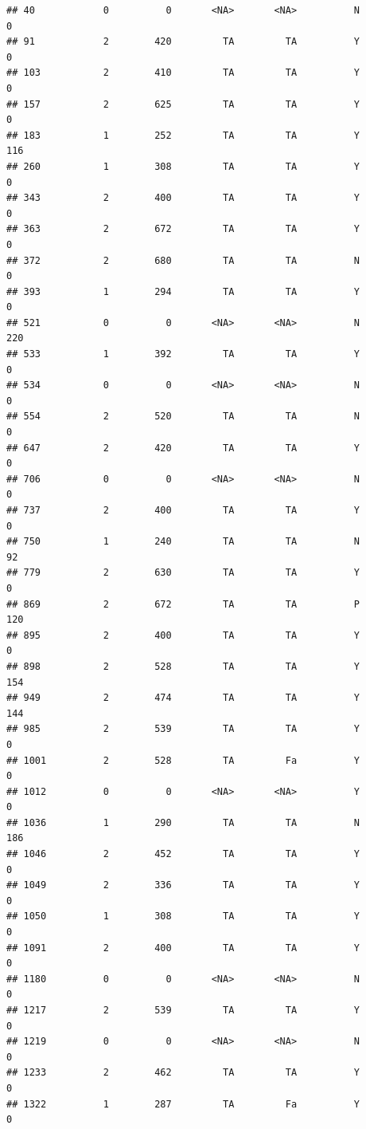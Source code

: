 \documentclass[]{article}
\begin{document}
\begin{verbatim}
## 40            0          0       <NA>       <NA>          N          0
## 91            2        420         TA         TA          Y          0
## 103           2        410         TA         TA          Y          0
## 157           2        625         TA         TA          Y          0
## 183           1        252         TA         TA          Y        116
## 260           1        308         TA         TA          Y          0
## 343           2        400         TA         TA          Y          0
## 363           2        672         TA         TA          Y          0
## 372           2        680         TA         TA          N          0
## 393           1        294         TA         TA          Y          0
## 521           0          0       <NA>       <NA>          N        220
## 533           1        392         TA         TA          Y          0
## 534           0          0       <NA>       <NA>          N          0
## 554           2        520         TA         TA          N          0
## 647           2        420         TA         TA          Y          0
## 706           0          0       <NA>       <NA>          N          0
## 737           2        400         TA         TA          Y          0
## 750           1        240         TA         TA          N         92
## 779           2        630         TA         TA          Y          0
## 869           2        672         TA         TA          P        120
## 895           2        400         TA         TA          Y          0
## 898           2        528         TA         TA          Y        154
## 949           2        474         TA         TA          Y        144
## 985           2        539         TA         TA          Y          0
## 1001          2        528         TA         Fa          Y          0
## 1012          0          0       <NA>       <NA>          Y          0
## 1036          1        290         TA         TA          N        186
## 1046          2        452         TA         TA          Y          0
## 1049          2        336         TA         TA          Y          0
## 1050          1        308         TA         TA          Y          0
## 1091          2        400         TA         TA          Y          0
## 1180          0          0       <NA>       <NA>          N          0
## 1217          2        539         TA         TA          Y          0
## 1219          0          0       <NA>       <NA>          N          0
## 1233          2        462         TA         TA          Y          0
## 1322          1        287         TA         Fa          Y          0

\end{verbatim}
\end{document}

